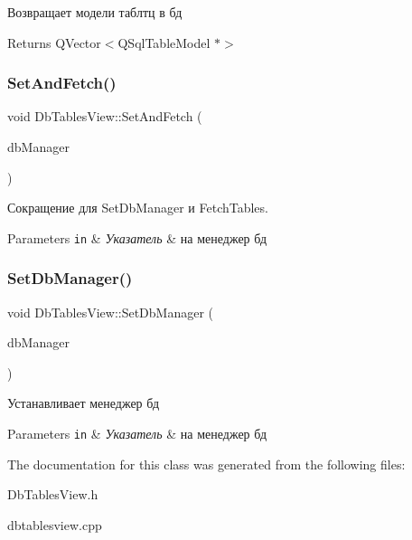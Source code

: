 Возвращает модели таблтц в бд 

\begin{DoxyReturn}{Returns}
Q\+Vector$<$\+Q\+Sql\+Table\+Model $\ast$$>$ 
\end{DoxyReturn}
\mbox{\label{class_db_tables_view_ad3d7529bd0acc4d08fe0d60616e96599}} 
\subsubsection{\texorpdfstring{Set\+And\+Fetch()}{SetAndFetch()}}
{\footnotesize\ttfamily void Db\+Tables\+View\+::\+Set\+And\+Fetch (\begin{DoxyParamCaption}\item[{\hyperlink{class_db_manager}{Db\+Manager} $\ast$}]{db\+Manager }\end{DoxyParamCaption})}



Сокращение для Set\+Db\+Manager и Fetch\+Tables. 


\begin{DoxyParams}[1]{Parameters}
\mbox{\tt in}  & {\em Указатель} & на менеджер бд \\
\hline
\end{DoxyParams}
\mbox{\label{class_db_tables_view_a0affcc4de194a59eff1ddbb68b88413e}} 
\subsubsection{\texorpdfstring{Set\+Db\+Manager()}{SetDbManager()}}
{\footnotesize\ttfamily void Db\+Tables\+View\+::\+Set\+Db\+Manager (\begin{DoxyParamCaption}\item[{\hyperlink{class_db_manager}{Db\+Manager} $\ast$}]{db\+Manager }\end{DoxyParamCaption})}



Устанавливает менеджер бд 


\begin{DoxyParams}[1]{Parameters}
\mbox{\tt in}  & {\em Указатель} & на менеджер бд \\
\hline
\end{DoxyParams}


The documentation for this class was generated from the following files\+:\begin{DoxyCompactItemize}
\item 
Db\+Tables\+View.\+h\item 
dbtablesview.\+cpp\end{DoxyCompactItemize}
